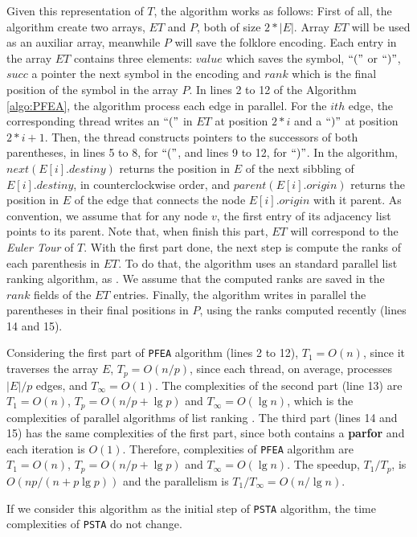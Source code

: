 Given this representation of $T$, the algorithm works as follows: 
First of all, the algorithm create two arrays, $ET$ and $P$, both of size $2*|E|$. Array $ET$ will be used as an auxiliar array, meanwhile $P$ will save the folklore encoding. Each entry in the array $ET$ contains three elements: $value$ which saves the symbol, $``("$ or $``)"$, $succ$ a pointer the next symbol in the encoding and $rank$ which is the final position of the symbol in the array $P$. In lines 2 to 12 of the Algorithm \ref{algo:PFEA}, the algorithm process each edge in parallel. For the $ith$ edge, the corresponding thread writes an $``("$ in $ET$ at position $2*i$ and a $``)"$ at position $2*i+1$. Then, the thread constructs pointers to the successors of both parentheses, in lines 5 to 8, for $``("$, and lines 9 to 12, for $``)"$. In the algorithm, $next(E[i].destiny)$ returns the position in $E$ of the next sibbling of $E[i].destiny$, in counterclockwise order, and $parent(E[i].origin)$ returns the position in $E$ of the edge that connects the node $E[i].origin$ with it parent. As convention, we assume that for any node $v$, the first entry of its adjacency list points to its parent. Note that, when finish this part, $ET$ will correspond to the \emph{Euler Tour} of $T$.
With the first part done, the next step is compute the ranks of each parenthesis in $ET$. To do that, the algorithm uses an standard parallel list ranking algorithm, as \cite{Helman2001265}. We assume that the computed ranks are saved in the $rank$ fields of the $ET$ entries. Finally, the algorithm writes in parallel the parentheses in their final positions in $P$, using the ranks computed recently (lines 14 and 15).

Considering the first part of {\tt PFEA} algorithm (lines 2 to 12), $T_1 = O(n)$, since it traverses the array $E$, $T_p = O(n/p)$, since each thread, on average, processes $|E|/p$ edges, and $T_{\infty} = O(1)$. The complexities of the second part (line 13) are $T_1=O(n)$, $T_p=O(n/p+\lg p)$ and $T_{\infty}=O(\lg n)$, which is the complexities of parallel algorithms of list ranking . The third part (lines 14 and 15) has the same complexities of the first part, since both contains a {\bf parfor} and each iteration is $O(1)$. Therefore, complexities of {\tt PFEA} algorithm are
$T_1=O(n)$, $T_p=O(n/p+\lg p)$ and $T_{\infty}=O(\lg n)$. The speedup, $T_1/T_p$, is $O(np/(n+p\lg p))$ and the parallelism is $T_1/T_{\infty} = O(n/\lg n)$.

If we consider this algorithm as the initial step of {\tt PSTA} algorithm, the time complexities of {\tt PSTA} do not change.



















